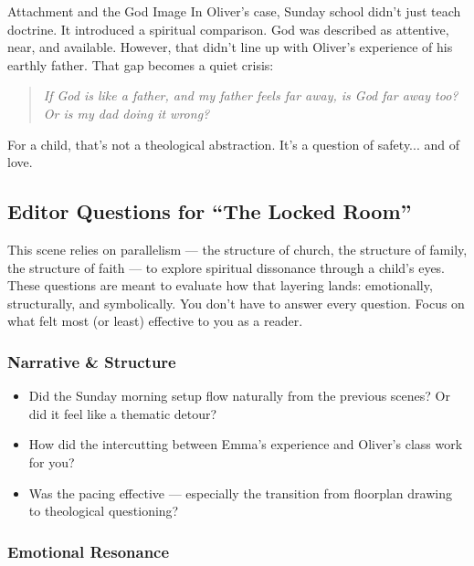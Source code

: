 \begin{PsychologicalSidebar}{Attachment and the God Image}
  In Oliver’s case, Sunday school didn’t just teach doctrine. It introduced a spiritual comparison. God 
  was described as attentive, near, and available. However, that didn’t line up with Oliver’s experience 
  of his earthly father. That gap becomes a quiet crisis:
  
  \begin{quote}
  \textit{If God is like a father, and my father feels far away, is God far away too?}  
  \textit{Or is my dad doing it wrong?}
  \end{quote}
  
  For a child, that’s not a theological abstraction. It’s a question of safety... and of love.
  
\end{PsychologicalSidebar}



\subsection*{Editor Questions for ``The Locked Room''}

This scene relies on parallelism — the structure of church, the structure of family, the structure of faith — to explore spiritual dissonance through a child’s eyes. These questions are meant to evaluate how that layering lands: emotionally, structurally, and symbolically. You don’t have to answer every question. Focus on what felt most (or least) effective to you as a reader.

\subsubsection*{Narrative \& Structure}

\begin{itemize}
  \item Did the Sunday morning setup flow naturally from the previous scenes? Or did it feel like a thematic detour?
  \item How did the intercutting between Emma’s experience and Oliver’s class work for you?
  \item Was the pacing effective — especially the transition from floorplan drawing to theological questioning?
\end{itemize}

\subsubsection*{Emotional Resonance}

